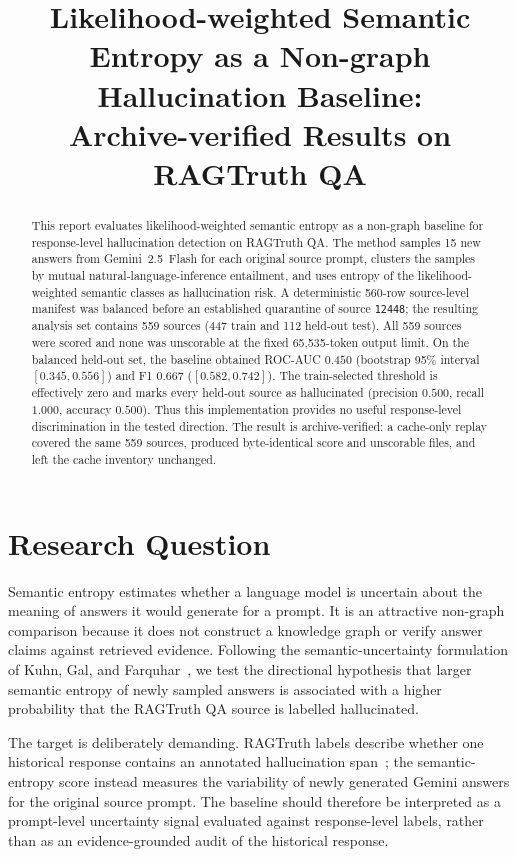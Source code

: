 \documentclass[11pt,a4paper]{article}
\title{\vspace{-1.2em}\textbf{Likelihood-weighted Semantic Entropy as a Non-graph Hallucination Baseline:}\\[-0.25em]
Archive-verified Results on RAGTruth QA}
\author{}
\date{}
\begin{document}
\maketitle
\vspace{-1.7em}

\begin{abstract}
This report evaluates likelihood-weighted semantic entropy as a non-graph baseline for response-level hallucination detection on RAGTruth QA.  The method samples 15 new answers from Gemini~2.5~Flash for each original source prompt, clusters the samples by mutual natural-language-inference entailment, and uses entropy of the likelihood-weighted semantic classes as hallucination risk.  A deterministic 560-row source-level manifest was balanced before an established quarantine of source \texttt{12448}; the resulting analysis set contains 559 sources (447 train and 112 held-out test).  All 559 sources were scored and none was unscorable at the fixed 65,535-token output limit.  On the balanced held-out set, the baseline obtained ROC-AUC $0.450$ (bootstrap 95\% interval $[0.345,0.556]$) and F1 $0.667$ ($[0.582,0.742]$).  The train-selected threshold is effectively zero and marks every held-out source as hallucinated (precision $0.500$, recall $1.000$, accuracy $0.500$).  Thus this implementation provides no useful response-level discrimination in the tested direction.  The result is archive-verified: a cache-only replay covered the same 559 sources, produced byte-identical score and unscorable files, and left the cache inventory unchanged.
\end{abstract}

\section{Research Question}

Semantic entropy estimates whether a language model is uncertain about the meaning of answers it would generate for a prompt.  It is an attractive non-graph comparison because it does not construct a knowledge graph or verify answer claims against retrieved evidence.  Following the semantic-uncertainty formulation of Kuhn, Gal, and Farquhar~\cite{kuhn2023}, we test the directional hypothesis that larger semantic entropy of newly sampled answers is associated with a higher probability that the RAGTruth QA source is labelled hallucinated.

The target is deliberately demanding.  RAGTruth labels describe whether one historical response contains an annotated hallucination span~\cite{niu2024}; the semantic-entropy score instead measures the variability of newly generated Gemini answers for the original source prompt.  The baseline should therefore be interpreted as a prompt-level uncertainty signal evaluated against response-level labels, rather than as an evidence-grounded audit of the historical response.
\end{document}
